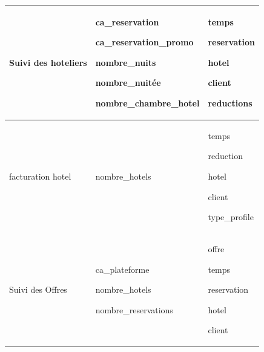 \begin{longtable}{|p{}|p{}|p{}|}
		\hline
		Suivi des hoteliers &  
		\begin{description}
		 \item ca\_reservation
		 \item ca\_reservation\_promo
		 \item nombre\_nuits
		 \item nombre\_nuitée
		 \item nombre\_chambre\_hotel
		 \end{description} &
		\begin{description}
		 \item temps
		 \item reservation
		 \item hotel
		 \item client
		 \item reductions
		 \end{description}
		\\  
		
		\hline
		facturation hotel &  
		\begin{description}
		 \item nombre\_hotels
		 \end{description} &
		\begin{description}
		 \item temps
		 \item reduction
		 \item hotel
		 \item client
		 \item type\_profile
		 \end{description}
		\\
		
		\hline
		Suivi des Offres &  
		\begin{description}
		 \item ca\_plateforme
		 \item nombre\_hotels
		 \item nombre\_reservations
		 \end{description} &
		\begin{description}
		 \item offre
		 \item temps
		 \item reservation
		 \item hotel
		 \item client
		 \end{description}
		\\
		
		\hline 
	\end{longtable} 

